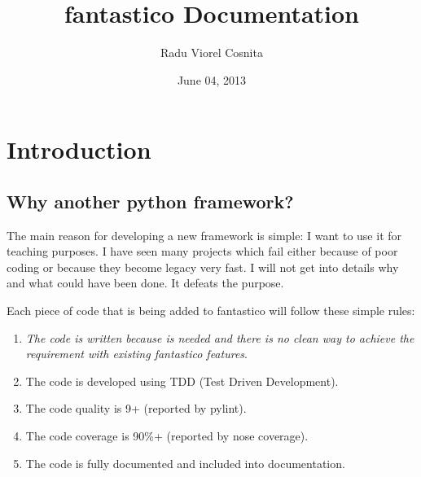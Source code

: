\documentclass[letterpaper,10pt,english]{sphinxmanual}
\title{fantastico Documentation}
\date{June 04, 2013}
\author{Radu Viorel Cosnita}
\begin{document}
\maketitle
\tableofcontents
{}\label{index::doc}



\chapter{Introduction}
\label{intro:introduction}\label{intro::doc}\label{intro:fantastico-framework}

\section{Why another python framework?}
\label{intro:why-another-python-framework}
The main reason for developing a new framework is simple: I want to use it for teaching purposes. I have seen many projects which
fail either because of poor coding or because they become legacy very fast. I will not get into details why and what could have
been done. It defeats the purpose.

Each piece of code that is being added to fantastico will follow these simple rules:
\begin{enumerate}
\item {} 
\emph{The code is written because is needed and there is no clean way to achieve the requirement with existing fantastico features}.

\item {} 
The code is developed using TDD (Test Driven Development).

\item {} 
The code quality is 9+ (reported by pylint).

\item {} 
The code coverage is 90\%+ (reported by nose coverage).

\item {} 
The code is fully documented and included into documentation.

\end{enumerate}
\end{document}
